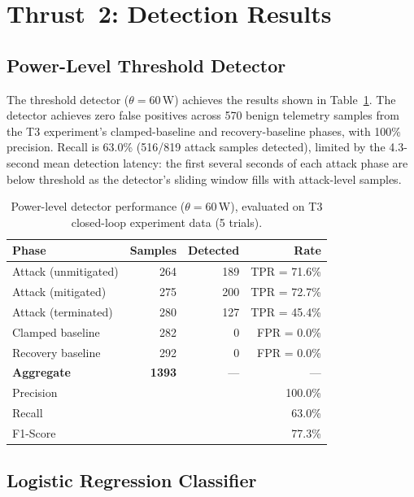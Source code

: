 \documentclass[conference]{IEEEtran}
\begin{document}
\section{Thrust~2: Detection Results}
\label{sec:t2}

\subsection{Power-Level Threshold Detector}

The threshold detector ($\theta = 60$\,W) achieves the results shown
in Table~\ref{tab:t2_det}.  The detector achieves zero false positives
across 570 benign telemetry samples from the T3 experiment's
clamped-baseline and recovery-baseline phases, with 100\% precision.
Recall is 63.0\% (516/819 attack samples detected), limited by the
4.3-second mean detection latency: the first several seconds of each
attack phase are below threshold as the detector's sliding window
fills with attack-level samples.

\begin{table}[t]
\centering
\caption{Power-level detector performance ($\theta = 60$\,W),
  evaluated on T3 closed-loop experiment data (5 trials).}
\label{tab:t2_det}
\begin{tabular}{lrrr}
\toprule
Phase & Samples & Detected & Rate \\
\midrule
Attack (unmitigated)  & 264 & 189 & TPR = 71.6\% \\
Attack (mitigated)    & 275 & 200 & TPR = 72.7\% \\
Attack (terminated)   & 280 & 127 & TPR = 45.4\% \\
Clamped baseline      & 282 &   0 & FPR = 0.0\% \\
Recovery baseline     & 292 &   0 & FPR = 0.0\% \\
\midrule
\textbf{Aggregate} & \textbf{1393} & --- & --- \\
\quad Precision & & & 100.0\% \\
\quad Recall    & & & 63.0\% \\
\quad F1-Score  & & & 77.3\% \\
\bottomrule
\end{tabular}
\end{table}

\subsection{Logistic Regression Classifier}
\end{document}
